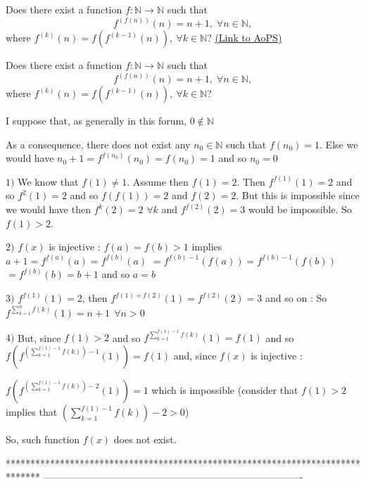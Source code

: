 \begin{problem}
	Does there exist a function $f: \mathbb{N} \rightarrow \mathbb{N}$ such that \[f^{\left(f(n)\right)}(n) = n + 1,\;\forall n \in \mathbb{N},\] where $f^{(k)}(n) = f\left(f^{(k - 1)}(n)\right),\ \forall k \in \mathbb{N}$?
	\flushright \href{https://artofproblemsolving.com/community/c6h51524}{(Link to AoPS)}
\end{problem}



\begin{mysolution}
	\begin{tcolorbox}Does there exist a function $ f: \mathbb{N} \rightarrow \mathbb{N}$ such that
\[ f^{\left(f(n)\right)}(n) = n + 1,\;\forall n \in \mathbb{N},
\]
where $ f^{(k)}(n) = f\left(f^{(k - 1)}(n)\right),\ \forall k \in \mathbb{N}$?\end{tcolorbox}

I suppose that, as generally in this forum, $ 0\notin\mathbb{N}$

As a consequence, there does not exist any $ n_0\in\mathbb{N}$ such that $ f(n_0)=1$. Else we would have $ n_0+1=f^{f(n_0)}(n_0)=f(n_0)=1$ and so $ n_0=0$

$ 1)$ We know that $ f(1)\neq 1$. Assume then $ f(1)=2$. Then $ f^{f(1)}(1)=2$ and so $ f^2(1)=2$ and so $ f(f(1))=2$ and $ f(2)=2$.
But this is impossible since we would have then $ f^k(2)=2$ $ \forall k$ and $ f^{f(2)}(2)=3$ would be impossible.
So $ f(1)>2$.

$ 2)$ $ f(x)$ is injective : $ f(a)=f(b)>1$ implies $ a+1=f^{f(a)}(a)=f^{f(b)}(a)$ $ =f^{f(b)-1}(f(a))=f^{f(b)-1}(f(b))$ $ =f^{f(b)}(b)=b+1$ and so $ a=b$

$ 3)$ $ f^{f(1)}(1)=2$, then $ f^{f(1)+f(2)}(1)=f^{f(2)}(2)=3$ and so on : So $ \boxed{f^{\sum_{k=1}^{n}f(k)}(1)=n+1\: \: \forall n>0}$

$ 4)$ But, since $ f(1)>2$ and so $ f^{\sum_{k=1}^{f(1)-1}f(k)}(1)=f(1)$ and so $ f(f^{(\sum_{k=1}^{f(1)-1}f(k))-1}(1))=f(1)$ and, since $ f(x)$ is injective :

$ f(f^{(\sum_{k=1}^{f(1)-1}f(k))-2}(1))=1$ which is impossible (consider that $ f(1)>2$ implies that $ (\sum_{k=1}^{f(1)-1}f(k))-2>0$)

So, such function $ f(x)$ does not exist.
\end{mysolution}
*******************************************************************************
-------------------------------------------------------------------------------

